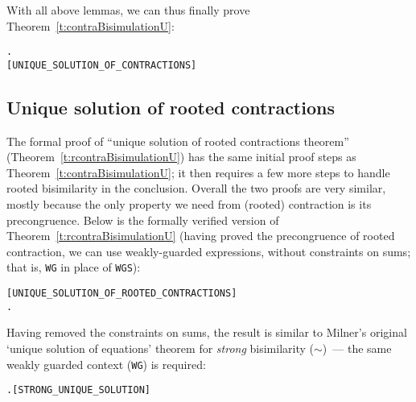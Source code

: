 {With all above lemmas, we can thus finally prove Theorem~\ref{t:contraBisimulationU}:
\begin{alltt}
\HOLTokenTurnstile{}   \HOLSymConst{\HOLTokenImp{}} \HOLSymConst{\HOLTokenForall{}} .  \HOLSymConst{\HOLTokenContracts{}}   \HOLSymConst{\HOLTokenConj{}}  \HOLSymConst{\HOLTokenContracts{}}   \HOLSymConst{\HOLTokenImp{}}  \HOLSymConst{\HOLTokenWeakEQ} 
\hfill{[UNIQUE_SOLUTION_OF_CONTRACTIONS]}
\end{alltt}

\subsection{Unique solution of rooted contractions}

The formal proof of ``unique solution of rooted contractions theorem''
(Theorem~\ref{t:rcontraBisimulationU}) has the
same initial proof steps as Theorem~\ref{t:contraBisimulationU}; 
it then requires a
few more steps to handle  rooted bisimilarity in the conclusion. 
Overall  the
two proofs are very similar, mostly because the only property we need
from (rooted) contraction is its precongruence. 
 Below is the formally verified version of
Theorem~\ref{t:rcontraBisimulationU}
(having proved
the precongruence of rooted contraction, 
we can use  weakly-guarded expressions,   without constraints on  sums;
that is, \texttt{WG} in place of \texttt{WGS}):

\begin{alltt}
\hfill{[UNIQUE_SOLUTION_OF_ROOTED_CONTRACTIONS]}
\HOLTokenTurnstile{}   \HOLSymConst{\HOLTokenImp{}} \HOLSymConst{\HOLTokenForall{}} .  \HOLSymConst{\HOLTokenObsContracts}   \HOLSymConst{\HOLTokenConj{}}  \HOLSymConst{\HOLTokenObsContracts}   \HOLSymConst{\HOLTokenImp{}}  \HOLSymConst{\HOLTokenObsCongr} 
\end{alltt}

Having removed the  constraints on sums, the result is
 similar to Milner's original `unique solution of
equations' theorem for \emph{strong} bisimilarity ($\sim$)~--- 
the same weakly guarded context (\texttt{WG}) is required:
\begin{alltt}
\HOLTokenTurnstile{}   \HOLSymConst{\HOLTokenImp{}} \HOLSymConst{\HOLTokenForall{}} .  \HOLSymConst{\HOLTokenStrongEQ}   \HOLSymConst{\HOLTokenConj{}}  \HOLSymConst{\HOLTokenStrongEQ}   \HOLSymConst{\HOLTokenImp{}}  \HOLSymConst{\HOLTokenStrongEQ} \hfill{[STRONG_UNIQUE_SOLUTION]}
\end{alltt}

}
